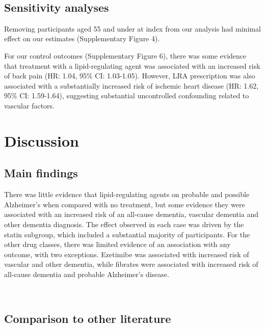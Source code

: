\documentclass[
]{article}
\begin{document}
~

\hypertarget{sensitivity-analyses}{%
\subsection{Sensitivity analyses}\label{sensitivity-analyses}}

Removing participants aged 55 and under at index from our analysis had minimal effect on our estimates (Supplementary Figure 4).

For our control outcomes (Supplementary Figure 6), there was some evidence that treatment with a lipid-regulating agent was associated with an increased risk of back pain (HR: 1.04, 95\% CI: 1.03-1.05). However, LRA prescription was also associated with a substantially increased risk of ischemic heart disease (HR: 1.62, 95\% CI: 1.59-1.64), suggesting substantial uncontrolled confounding related to vascular factors.

\newpage

\hypertarget{discussion}{%
\section{Discussion}\label{discussion}}

\hypertarget{main-findings}{%
\subsection{Main findings}\label{main-findings}}

There was little evidence that lipid-regulating agents on probable and possible Alzheimer's when compared with no treatment, but some evidence they were associated with an increased risk of an all-cause dementia, vascular dementia and other dementia diagnosis. The effect observed in each case was driven by the statin subgroup, which included a substantial majority of participants. For the other drug classes, there was limited evidence of an association with any outcome, with two exceptions. Ezetimibe was associated with increased risk of vascular and other dementia, while fibrates were associated with increased risk of all-cause dementia and probable Alzheimer's disease.

~

\hypertarget{comparison-to-other-literature}{%
\subsection{Comparison to other literature}\label{comparison-to-other-literature}}
\end{document}
